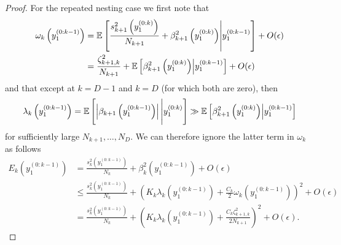 \begin{proof}
For the repeated nesting case we first note that
\begin{align*}
\omega_k\left(y_1^{(0:k-1)} \right) &= \mathbb{E} \left[\frac{s_{k+1}^2 \left(y_1^{(0:k)}\right)}{N_{k+1}} + \beta^2_{k+1} 
\left(y_1^{(0:k)}\right) \middle|  y_1^{(0:k-1)} \right] + O(\epsilon) \\
&= \frac{\zeta_{k+1,k}^2}{N_{k+1}}+\mathbb{E} \left[\beta^2_{k+1} 
\left(y_1^{(0:k)}\right) \middle|  y_1^{(0:k-1)} \right] + O(\epsilon) 
\end{align*}
and that except at $k=D-1$ and $k=D$ (for which both are zero), then
\[
\lambda_k\left(y_1^{(0:k-1)} \right) = \mathbb{E} \left[\left|\beta_{k+1} 
\left(y_1^{(0:k-1)}\right) \right| \Bigg|  y_1^{(0:k)}\right] \gg
\mathbb{E} \left[\beta^2_{k+1} 
\left(y_1^{(0:k)}\right) \middle|  y_1^{(0:k-1)} \right]
\]
for sufficiently large $N_{k+1},\dots,N_D$.
 We can therefore ignore the latter term in $\omega_k$ as follows
 \begin{align*}
  E_k \left(y_1^{(0:k-1)}\right) 
 &=\frac{s_k^2 \left(y_1^{(0:k-1)}\right)}{N_k}+ \beta_k^2 \left(y_1^{(0:k-1)} \right) +O(\epsilon) \\
 &\le \frac{s_k^2 \left(y_1^{(0:k-1)}\right)}{N_k}+ \left(K_k \lambda_k \left(y_1^{(0:k-1)} \right) +
 \frac{C_k}{2} \omega_k\left(y_1^{(0:k-1)} \right) \right)^2+O(\epsilon) \\
 &= \frac{s_k^2 \left(y_1^{(0:k-1)}\right)}{N_k}
 +\left(K_k \lambda_k \left(y_1^{(0:k-1)}\right) 
 +\frac{C_k \zeta_{k+1,k}^2}{2 N_{k+1}}\right)^2 + O(\epsilon).
 \end{align*}

\end{proof}
